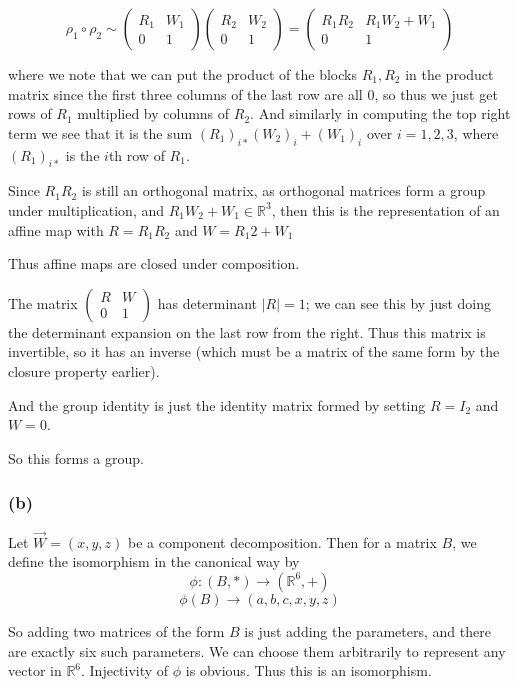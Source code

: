 \documentclass{article}
\begin{document}
\[\rho_1 \circ \rho_2 \sim \left(\begin{array}{cc} R_1 & W_1 \\ 0 & 1 \end{array}\right) \left( \begin{array}{cc} R_2 & W_2 \\ 0 & 1 \end{array}\right) = \left(\begin{array}{cc} R_1 R_2 & R_1 W_2 + W_1 \\ 0 & 1 \end{array}\right)\]

where we note that we can put the product of the blocks $R_1, R_2$ in the product matrix since the first three columns of the last row are all 0, so thus we just get rows of $R_1$ multiplied by columns of $R_2$. And similarly in computing the top right term we see that it is the sum $(R_1)_{i*} (W_2)_i + (W_1)_i$ over $i=1,2,3$, where $(R_1)_{i*}$ is the $i$th row of $R_1$. 

Since $R_1 R_2$ is still an orthogonal matrix, as orthogonal matrices form a group under multiplication, and $R_1 W_2 + W_1 \in \mathbb{R}^3$, then this is the representation of an affine map with $R = R_1 R_2$ and $W = R_1 2 + W_1$

Thus affine maps are closed under composition. 

The matrix $\left(\begin{array}{cc} R & W \\ 0 & 1 \end{array}\right)$ has determinant $|R| = 1$; we can see this by just doing the determinant expansion on the last row from the right. Thus this matrix is invertible, so it has an inverse (which must be a matrix of the same form by the closure property earlier). 

And the group identity is just the identity matrix formed by setting $R = I_2$ and $W = 0$. 

So this forms a group.

\subsubsection{(b)} 

Let $\vec{W} = (x,y,z)$ be a component decomposition. Then for a matrix $B$, we define the isomorphism  in the canonical way by 
\[ \phi : (B, *) \longrightarrow (\mathbb{R}^6, +) \]
\[ \phi(B) \longrightarrow (a,b,c,x,y,z) \]

So adding two matrices of the form $B$ is just adding the parameters, and there are exactly six such parameters. We can choose them arbitrarily to represent any vector in $\mathbb{R}^6$. Injectivity of $\phi$ is obvious. Thus this is an isomorphism. 
\end{document}
